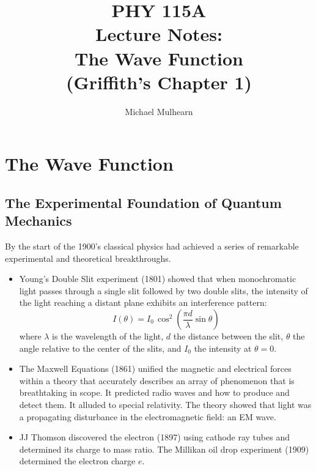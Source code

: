 \documentclass[12pt]{book}
\begin{document}
\newcommand{\ihbar}{\ensuremath{i \hbar}}
\newcommand{\Pss}{\ensuremath{\Psi^*}}
\newcommand{\dPsidt}{\ensuremath{ \frac{\partial \Psi}{\partial t} }}
\newcommand{\dPsidx}{\ensuremath{ \frac{\partial \Psi}{\partial x} }}
\newcommand{\ddPsidx}{\ensuremath{ \frac{\partial^2 \Psi}{\partial x^2} }}
\newcommand{\dPssdt}{\ensuremath{ \frac{\partial \Psi^*}{\partial t} }}
\newcommand{\dPssdx}{\ensuremath{ \frac{\partial \Psi^*}{\partial x} }}
\newcommand{\ddPssdx}{\ensuremath{ \frac{\partial^2 \Psi^*}{\partial x^2} }}

\title{PHY 115A \\ Lecture Notes:\\
The Wave Function \\ (Griffith's Chapter 1) \\}
\author{Michael Mulhearn}

\maketitle

\chapter{The Wave Function}

\section{The Experimental Foundation of Quantum Mechanics}

By the start of the 1900's classical physics had achieved a series of remarkable experimental and theoretical breakthroughs.
\begin{itemize}

\item Young's Double Slit experiment (1801) showed that when monochromatic light passes through a single slit followed by two double slits, the intensity of the light reaching a distant plane exhibits an interference pattern:
\begin{displaymath}
I(\theta) = I_0 \, \cos^2\left(\frac{\pi d}{\lambda} \sin \theta \right)
\end{displaymath}
where $\lambda$ is the wavelength of the light, $d$ the distance between the slit, $\theta$ the angle relative to the center of the slits, and $I_0$ the intensity at $\theta=0$.  

\item The Maxwell Equations (1861) unified the magnetic and electrical forces within a theory that accurately describes an array of phenomenon that is breathtaking in scope.  It predicted radio waves and how to produce and detect them.  It alluded to special relativity.  The theory showed that light was a propagating disturbance in the electromagnetic field: an EM wave.
\item JJ Thomson discovered the electron (1897) using cathode ray tubes and determined its charge to mass ratio.  The Millikan oil drop experiment (1909) determined the electron charge $e$.
\end{itemize}
\end{document}
